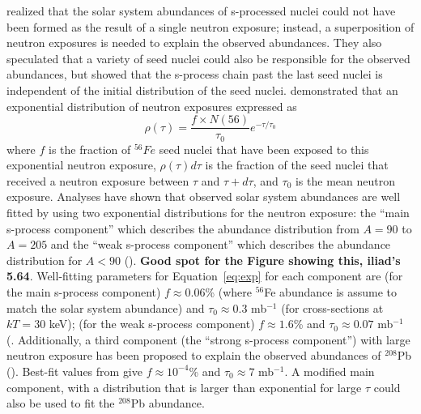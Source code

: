 \cite{claytonetal1961} realized that the solar system
abundances of s-processed nuclei could not have been formed as the
result of a single neutron exposure; instead, a superposition of
neutron exposures is needed to explain the observed abundances. They
also speculated that a variety of seed nuclei could also be
responsible for the observed abundances, but \cite{clayton1974} showed
that the s-process chain past the last seed nuclei is independent of
the initial distribution of the seed nuclei.  \cite{seegeretal1965}
demonstrated that an exponential distribution of neutron exposures
expressed as
\begin{equation}
\label{eq:exp}
\rho(\tau)=\frac{f\times N(56)}{\tau_0}e^{-\tau/\tau_0}
\end{equation}
where $f$ is the fraction of $^{56}Fe$ seed nuclei that have been
exposed to this exponential neutron exposure, $\rho(\tau)d\tau$ is the
fraction of the seed nuclei that
received a neutron exposure between $\tau$ and $\tau + d\tau$, and 
$\tau_0$ is the mean neutron exposure.  Analyses have shown that
observed solar system abundances are well fitted by using two
exponential distributions for the neutron exposure: the ``main
s-process component'' which describes the abundance distribution from
$A=90$ to $A=205$ and the ``weak s-process component'' which describes
the abundance distribution for $A<90$ (\citealt{iliadis2008}).  {\bf
Good spot for the Figure showing this, iliad's 5.64}.
Well-fitting 
parameters for Equation~\ref{eq:exp} for each component
are (for the main s-process component) $f\approx 0.06$\% (where
$^{56}$Fe abundance is assume to match the solar system abundance) and
$\tau_0\approx 0.3$ mb$^{-1}$ (for cross-sections at $kT=30$ keV);
(for the weak s-process component) $f\approx 1.6$\% and $\tau_0\approx
0.07$ mb$^{-1}$ (\citealt{kappeleretal1990}.  Additionally, a third component (the ``strong
s-process component'') with large neutron exposure has been proposed
to explain the observed
abundances of $^{208}$Pb (\citealt{clayton1967}).  Best-fit values
from \cite{kappeleretal1990} give $f\approx 10^{-4}$\% and $\tau_0\approx
7$ mb$^{-1}$.  A modified main component, with a distribution that is
larger than exponential for large $\tau$ could also be used to fit the
$^{208}$Pb abundance.


